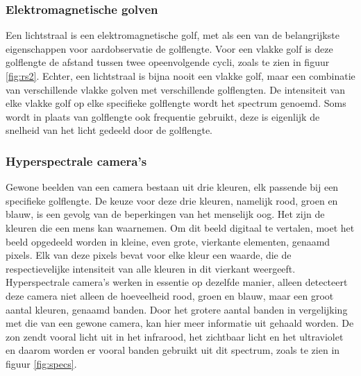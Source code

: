 \documentclass[12pt]{report}
\begin{document}

\subsubsection{Elektromagnetische golven}
Een lichtstraal is een elektromagnetische golf, met als een van de belangrijkste eigenschappen voor aardobservatie de golflengte. Voor een vlakke golf is deze golflengte de afstand tussen twee opeenvolgende cycli, zoals te zien in figuur \ref{fig:rs2}. Echter, een lichtstraal is bijna nooit een vlakke golf, maar een combinatie van verschillende vlakke golven met verschillende golflengten. De intensiteit van elke vlakke golf op elke specifieke golflengte wordt het spectrum genoemd. Soms wordt in plaats van golflengte ook frequentie gebruikt, deze is eigenlijk de snelheid van het licht gedeeld door de golflengte.

\subsubsection{Hyperspectrale camera's}
Gewone beelden van een camera bestaan uit drie kleuren, elk passende bij een specifieke golflengte. De keuze voor deze drie kleuren, namelijk rood, groen en blauw, is een gevolg van de beperkingen van het menselijk oog. Het zijn de kleuren die een mens kan waarnemen. Om dit beeld digitaal te vertalen, moet het beeld opgedeeld worden in kleine, even grote, vierkante elementen, genaamd pixels. Elk van deze pixels bevat voor elke kleur een waarde, die de respectievelijke intensiteit van alle kleuren in dit vierkant weergeeft. Hyperspectrale camera's werken in essentie op dezelfde manier, alleen detecteert deze camera niet alleen de hoeveelheid rood, groen en blauw, maar een groot aantal kleuren, genaamd banden. Door het grotere aantal banden in vergelijking met die van een gewone camera, kan hier meer informatie uit gehaald worden. De zon zendt vooral licht uit in het infrarood, het zichtbaar licht en het ultraviolet en daarom worden er vooral banden gebruikt uit dit spectrum, zoals te zien in figuur \ref{fig:specs}.
\end{document}
